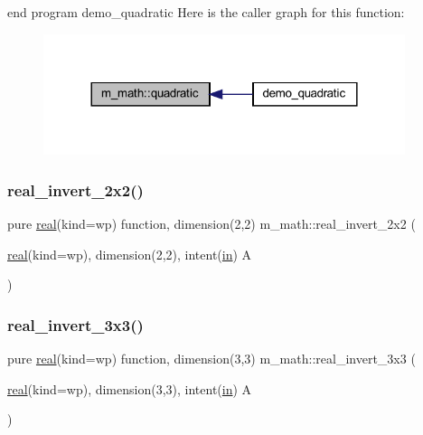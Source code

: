 end program demo\+\_\+quadratic Here is the caller graph for this function\+:
\nopagebreak
\begin{figure}[H]
\begin{center}
\leavevmode
\includegraphics[width=300pt]{namespacem__math_a59bbb085b083b802178b8de41c9bb343_icgraph}
\end{center}
\end{figure}
\mbox{\label{namespacem__math_aa8b68ce8fb1a10c992e769f2e042979e}} 
\subsubsection{\texorpdfstring{real\+\_\+invert\+\_\+2x2()}{real\_invert\_2x2()}}
{\footnotesize\ttfamily pure \hyperlink{read__watch_83_8txt_abdb62bde002f38ef75f810d3a905a823}{real}(kind=wp) function, dimension(2,2) m\+\_\+math\+::real\+\_\+invert\+\_\+2x2 (\begin{DoxyParamCaption}\item[{\hyperlink{read__watch_83_8txt_abdb62bde002f38ef75f810d3a905a823}{real}(kind=wp), dimension(2,2), intent(\hyperlink{M__journal_83_8txt_afce72651d1eed785a2132bee863b2f38}{in})}]{A }\end{DoxyParamCaption})\hspace{0.3cm}{\ttfamily [private]}}

\mbox{\label{namespacem__math_a79f32ff4d35916ca4422bb8ce0d30113}} 
\subsubsection{\texorpdfstring{real\+\_\+invert\+\_\+3x3()}{real\_invert\_3x3()}}
{\footnotesize\ttfamily pure \hyperlink{read__watch_83_8txt_abdb62bde002f38ef75f810d3a905a823}{real}(kind=wp) function, dimension(3,3) m\+\_\+math\+::real\+\_\+invert\+\_\+3x3 (\begin{DoxyParamCaption}\item[{\hyperlink{read__watch_83_8txt_abdb62bde002f38ef75f810d3a905a823}{real}(kind=wp), dimension(3,3), intent(\hyperlink{M__journal_83_8txt_afce72651d1eed785a2132bee863b2f38}{in})}]{A }\end{DoxyParamCaption})\hspace{0.3cm}{\ttfamily [private]}}

